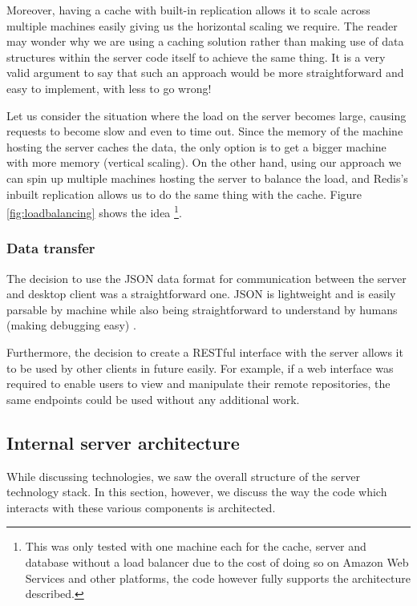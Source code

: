 Moreover, having a cache with built-in replication allows it to scale across multiple machines easily giving us the horizontal scaling we require. The reader may wonder why we are using a caching solution rather than making use of data structures within the server code itself to achieve the same thing. It is a very valid argument to say that such an approach would be more straightforward and easy to implement, with less to go wrong!

Let us consider the situation where the load on the server becomes large, causing requests to become slow and even to time out. Since the memory of the machine hosting the server caches the data, the only option is to get a bigger machine with more memory (vertical scaling). On the other hand, using our approach we can spin up multiple machines hosting the server to balance the load, and Redis's inbuilt replication allows us to do the same thing with the cache. Figure \ref{fig:loadbalancing} shows the idea \footnote{This was only tested with one machine each for the cache, server and database without a load balancer due to the cost of doing so on Amazon Web Services and other platforms, the code however fully supports the architecture described.}.


\subsubsection{Data transfer}

The decision to use the JSON data format for communication between the server and desktop client was a straightforward one. JSON is lightweight and is easily parsable by machine while also being straightforward to understand by humans (making debugging easy) \cite{json}.

Furthermore, the decision to create a RESTful interface with the server allows it to be used by other clients in future easily. For example, if a web interface was required to enable users to view and manipulate their remote repositories, the same endpoints could be used without any additional work.

\subsection{Internal server architecture}

While discussing technologies, we saw the overall structure of the server technology stack. In this section, however, we discuss the way the code which interacts with these various components is architected.

